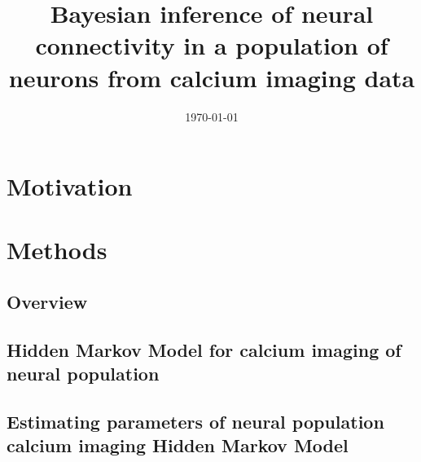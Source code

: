 \documentclass[amsmath, amssymb]{revtex4}
\begin{document}

\date{\today}

\title{Bayesian inference of neural connectivity in a population of neurons from 
calcium imaging data}

\begin{abstract}

\end{abstract}

\maketitle

\section{Motivation}
\label{sec1}


\section{Methods}
\label{sec:methods}

\subsection{Overview}
\label{sec:methods:introduction}


\subsection{Hidden Markov Model for calcium imaging of neural population}
\label{sec:methods:markov-setup}


\subsection{Estimating parameters of neural population calcium imaging Hidden Markov Model}
\label{sec:methods:estimating_parameters}

\end{document}
